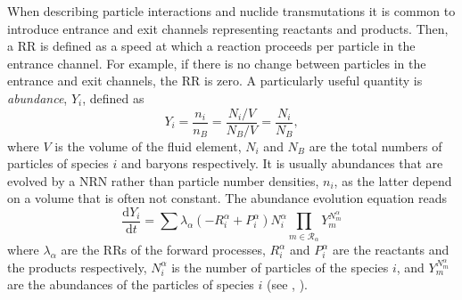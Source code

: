When describing particle interactions and nuclide transmutations it is 
common to introduce entrance 
and exit channels representing reactants and products. Then, a \ac{RR} 
is defined as a speed at which a reaction proceeds per particle in the 
entrance channel. For example, if there is no change between particles 
in the entrance and exit channels, the \ac{RR} is zero. 
%
A particularly useful quantity is \textit{abundance}, $Y_i$, defined as 
%
\begin{equation}
\label{eq:theory:nuc:abundance}
Y_i = \frac{n_i}{n_B} = \frac{N_i/V}{N_B/V} = \frac{N_i}{N_B},
\end{equation}
%
where $V$ is the volume of the fluid element, $N_i$ and $N_B$ are the 
total numbers of particles of species $i$ and baryons respectively. 
It is usually abundances that are evolved by a \ac{NRN} rather than 
particle number densities, $n_i$, as the latter depend on a volume that 
is often not constant. 
%
The abundance evolution equation reads
%
\begin{equation}
\frac{\text{d}Y_i}{\text{d}t} = \sum\lambda_{\alpha}(-R_{i}^{\alpha}+P_{i}^{\alpha})N_{i}^{\alpha}\prod_{m\in\mathcal{R}_{\alpha}}Y_m^{N_{m}^{\alpha}}
\end{equation}
%
where $\lambda_{\alpha}$ are the \acp{RR} of the forward processes, 
$R_{i}^{\alpha}$ and $P_{i}^{\alpha}$ are the reactants and the products respectively, 
$N_{i}^{\alpha}$ is the number of particles of the species $i$,  
and $Y_m^{N_{m}^{\alpha}}$ are the abundances of the particles of species $i$ 
(see \eg, \citet{Hix:1999}).

